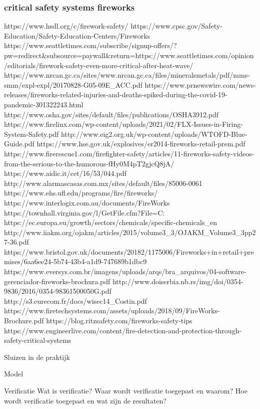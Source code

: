 \subsubsection{critical safety systems fireworks}

https://www.hsdl.org/c/firework-safety/
https://www.cpsc.gov/Safety-Education/Safety-Education-Centers/Fireworks
https://www.seattletimes.com/subscribe/signup-offers/?pw=redirect&subsource=paywall&return=https://www.seattletimes.com/opinion/editorials/firework-safety-even-more-critical-after-heat-wave/
https://www.nrcan.gc.ca/sites/www.nrcan.gc.ca/files/mineralsmetals/pdf/mms-smm/expl-expl/20170828-G05-09E_ACC.pdf
https://www.prnewswire.com/news-releases/fireworks-related-injuries-and-deaths-spiked-during-the-covid-19-pandemic-301322243.html
https://www.osha.gov/sites/default/files/publications/OSHA3912.pdf
https://www.firelinx.com/wp-content/uploads/2021/02/FLX-Issues-in-Firing-System-Safety.pdf
http://www.eig2.org.uk/wp-content/uploads/WTOFD-Blue-Guide.pdf
https://www.hse.gov.uk/explosives/er2014-fireworks-retail-prem.pdf
https://www.firerescue1.com/firefighter-safety/articles/11-fireworks-safety-videos-from-the-serious-to-the-humorous-fHy0M4pT2gjcQ8jA/
https://www.aidic.it/cet/16/53/044.pdf
http://www.alarmascasas.com.mx/sites/default/files/85006-0061%
https://www.ehs.ufl.edu/programs/fire/fireworks/
https://www.interlogix.com.au/documents/FireWorks%
https://townhall.virginia.gov/l/GetFile.cfm?File=C:%
https://ec.europa.eu/growth/sectors/chemicals/specific-chemicals_en
http://www.iiakm.org/ojakm/articles/2015/volume3_3/OJAKM_Volume3_3pp27-36.pdf
https://www.bristol.gov.uk/documents/20182/1175006/Fireworks+in+retail+premises/6aa6ee24-5b74-43b4-a1d9-747689b1dbc9
https://www.eversys.com.br/imagens/uploads/arqs/bra_arquivos/04-software-gerenciador-fireworks-brochura.pdf
http://www.doiserbia.nb.rs/img/doi/0354-9836/2016/0354-98361500050G.pdf
http://s3.eurecom.fr/docs/wisec14_Costin.pdf
https://www.firetechsystems.com/assets/uploads/2018/09/FireWorks-Brochure.pdf
https://blog.ritzsafety.com/fireworks-safety-tips
https://www.engineerlive.com/content/fire-detection-and-protection-through-safety-critical-systems

Sluizen in de praktijk





Model

Verificatie
Wat is verificatie?
Waar wordt verificatie toegepast en waarom?
Hoe wordt verificatie toegepast en wat zijn de resultaten?


